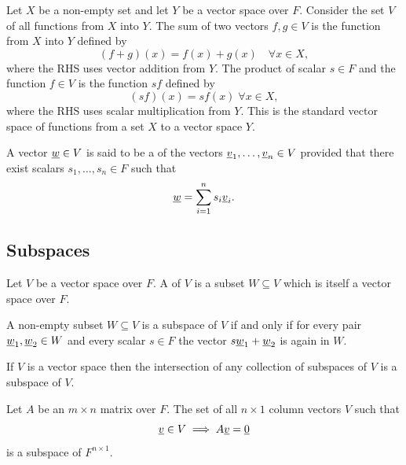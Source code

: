 \begin{example}
Let $X$ be a non-empty set and let $Y$ be a vector space over $F$.
Consider the set $V$ of all functions from $X$ into $Y$.
The sum of two vectors $f,g \in V$ is the function from $X$ into $Y$ defined by
\begin{equation*}
(f + g)(x) = f(x) + g(x) \quad \forall x \in X,
\end{equation*}
where the RHS uses vector addition from $Y$.
The product of scalar $s \in F$ and the function $f \in V$ is the function $sf$ defined by
\begin{equation*}
(sf)(x) = s f(x) \; \forall x \in X,
\end{equation*}
where the RHS uses scalar multiplication from $Y$.
This is the standard vector space of functions from a set $X$ to a vector space $Y$.
\end{example}

\begin{definition}
A vector $\underline{w} \in V$ is said to be a  of the vectors $\underline{v}_1, \ldots, \underline{v}_n \in V$ provided that there exist scalars $s_1, \ldots, s_n \in F$ such that
\begin{equation*}
\underline{w} = \sum_{i=1}^n s_i \underline{v}_i.
\end{equation*}
\end{definition}

\subsection{Subspaces}

\begin{definition}
Let $V$ be a vector space over $F$.
A  of $V$ is a subset $W \subseteq V$ which is itself a vector space over $F$.
\end{definition}

\begin{fact}
A non-empty subset $W \subseteq V$ is a subspace of $V$ if and only if for every pair $\underline{w}_1, \underline{w}_2 \in W$ and every scalar $s \in F$ the vector $s \underline{w}_1 + \underline{w}_2$ is again in $W$.
\end{fact}
If $V$ is a vector space then the intersection of any collection of subspaces of $V$ is a subspace of $V$.

\begin{example}
Let $A$ be an $m \times n$ matrix over $F$.
The set of all $n \times 1$ column vectors $V$ such that
\begin{equation*}
\underline{v} \in V \implies A \underline{v} = \underline{0}
\end{equation*}
is a subspace of $F^{n \times 1}$.
\end{example}

